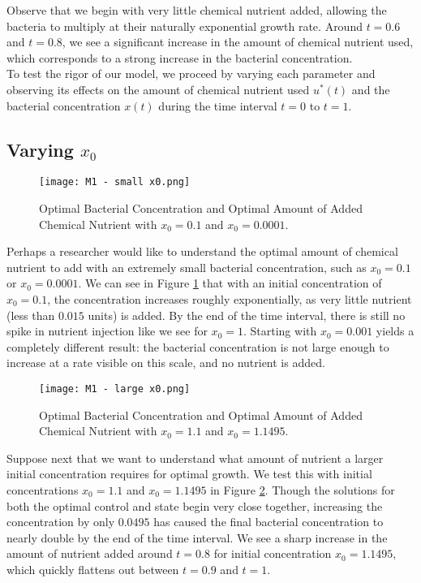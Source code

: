 \documentclass[10pt]{article}
\theoremstyle{exmp}
\begin{document}
\noindent Observe that we begin with very little chemical nutrient added, allowing the bacteria to multiply at their naturally exponential growth rate. Around $t = 0.6$ and $t = 0.8$, we see a significant increase in the amount of chemical nutrient used, which corresponds to a strong increase in the bacterial concentration. \\

\noindent To test the rigor of our model, we proceed by varying each parameter and observing its effects on the amount of chemical nutrient used $u^*(t)$ and the bacterial concentration $x(t)$ during the time interval $t = 0$ to $t = 1$.

\subsection{Varying $x_0$}

\begin{figure}
\centering
\texttt{[image: M1 - small x0.png]}
\caption{Optimal Bacterial Concentration and Optimal Amount of Added Chemical Nutrient with $x_0 = 0.1$ and $x_0 = 0.0001$.}
\label{fig:sx0}
\end{figure}

\noindent Perhaps a researcher would like to understand the optimal amount of chemical nutrient to add with an extremely small bacterial concentration, such as  $x_0 = 0.1$ or $x_0 = 0.0001$. We can see in Figure \ref{fig:sx0} that with an initial concentration of $x_0 = 0.1$, the concentration increases roughly exponentially, as very little nutrient (less than $0.015$ units) is added. By the end of the time interval, there is still no spike in nutrient injection like we see for $x_0 = 1$. Starting with $x_0 = 0.001$ yields a completely different result: the bacterial concentration is not large enough to increase at a rate visible on this scale, and no nutrient is added. \\

\begin{figure}
\centering
\texttt{[image: M1 - large x0.png]}
\caption{Optimal Bacterial Concentration and Optimal Amount of Added Chemical Nutrient with $x_0 = 1.1$ and $x_0 = 1.1495$.}
\label{fig:Lx0}
\end{figure}

\noindent Suppose next that we want to understand what amount of nutrient a larger initial concentration requires for optimal growth. We test this with initial concentrations $x_0 = 1.1$ and $x_0 = 1.1495$ in Figure \ref{fig:Lx0}. Though the solutions for both the optimal control and state begin very close together, increasing the concentration by only $0.0495$ has caused the final bacterial concentration to nearly double by the end of the time interval. We see a sharp increase in the amount of nutrient added around $t = 0.8$ for initial concentration $x_0 = 1.1495$, which quickly flattens out between $t = 0.9$ and $t = 1$. \\
\end{document}
